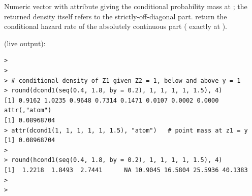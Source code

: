 \documentclass[11pt,a4paper]{article}
\begin{document}
%
\begin{Value}
Numeric vector with attribute  giving the
conditional probability mass at ; the returned
density itself refers to the strictly-off-diagonal part.
 return the conditional hazard rate of the
absolutely continuous part ( exactly at ).
\end{Value}
%


\vspace{0.8em}
 (live output):
\begin{lstlisting}
> 
> 
> # conditional density of Z1 given Z2 = 1, below and above y = 1
> round(dcond1(seq(0.4, 1.8, by = 0.2), 1, 1, 1, 1, 1.5), 4)
[1] 0.9162 1.0235 0.9648 0.7314 0.1471 0.0107 0.0002 0.0000
attr(,"atom")
[1] 0.08968704
> attr(dcond1(1, 1, 1, 1, 1, 1.5), "atom")   # point mass at z1 = y
[1] 0.08968704
> 
> round(hcond1(seq(0.4, 1.8, by = 0.2), 1, 1, 1, 1, 1.5), 4)
[1]  1.2218  1.8493  2.7441      NA 10.9045 16.5804 25.5936 40.1383
> 
> 
\end{lstlisting}


\newpage
\end{document}
